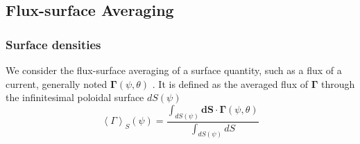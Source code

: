 

\label{moments}

\subsection{Flux-surface Averaging}

\subsubsection{Surface densities}

We consider the flux-surface averaging of a surface quantity, such as a flux
of a current, generally noted $\mathbf{\Gamma}\left( \psi,\theta\right) $ .
It is defined as the averaged flux of $\mathbf{\Gamma}$ through the
infinitesimal poloidal surface $dS\left( \psi\right) $
\begin{equation}
\left\langle \Gamma\right\rangle _{S}\left( \psi\right) =\frac{
\int_{dS\left( \psi\right) }\mathbf{dS\cdot\Gamma}\left( \psi ,\theta\right)
}{\int_{dS\left( \psi\right) }dS}
\end{equation}

